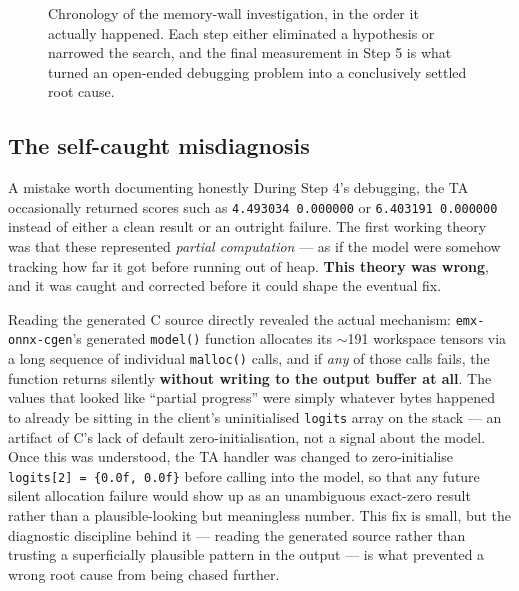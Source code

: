 \documentclass[11pt,a4paper]{report}
\newcommand{\code}[1]{\texttt{\small #1}}
\begin{document}
\begin{figure}[H]
\caption{Chronology of the memory-wall investigation, in the order it actually happened. Each step
either eliminated a hypothesis or narrowed the search, and the final measurement in Step 5 is what
turned an open-ended debugging problem into a conclusively settled root cause.}
\label{fig:memory-wall}
\end{figure}

\subsection{The self-caught misdiagnosis}
\label{sec:garbage}

\begin{crisisbox}{A mistake worth documenting honestly}
During Step 4's debugging, the TA occasionally returned scores such as \code{4.493034 0.000000} or
\code{6.403191 0.000000} instead of either a clean result or an outright failure. The first working
theory was that these represented \emph{partial computation} --- as if the model were somehow
tracking how far it got before running out of heap. \textbf{This theory was wrong}, and it was
caught and corrected before it could shape the eventual fix.
\end{crisisbox}

Reading the generated C source directly revealed the actual mechanism: \code{emx-onnx-cgen}'s
generated \code{model()} function allocates its $\sim$191 workspace tensors via a long sequence of
individual \code{malloc()} calls, and if \emph{any} of those calls fails, the function returns
silently \textbf{without writing to the output buffer at all}. The values that looked like ``partial
progress'' were simply whatever bytes happened to already be sitting in the client's uninitialised
\code{logits} array on the stack --- an artifact of C's lack of default zero-initialisation, not a
signal about the model. Once this was understood, the TA handler was changed to
zero-initialise \code{logits[2] = \{0.0f, 0.0f\}} before calling into the model, so that any future
silent allocation failure would show up as an unambiguous exact-zero result rather than a
plausible-looking but meaningless number. This fix is small, but the diagnostic discipline behind
it --- reading the generated source rather than trusting a superficially plausible pattern in the
output --- is what prevented a wrong root cause from being chased further.
\end{document}
